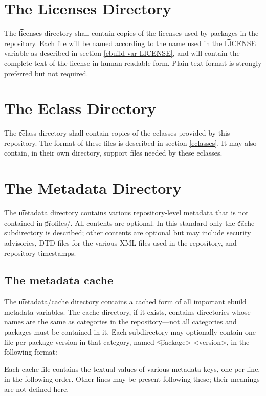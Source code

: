 \section{The Licenses Directory}
\label{licenses-dir}

The \t{licenses} directory shall contain copies of the licenses used by packages in the
repository. Each file will be named according to the name used in the \t{LICENSE} variable as
described in section \ref{ebuild-var-LICENSE}, and will contain the complete text of the license in
human-readable form. Plain text format is strongly preferred but not required.

\section{The Eclass Directory}
\label{eclass-dir}

The \t{eclass} directory shall contain copies of the eclasses provided by this repository. The
format of these files is described in section \ref{eclasses}. It may also contain, in their own
directory, support files needed by these eclasses.

\section{The Metadata Directory}
\label{metadata-dir}

The \t{metadata} directory contains various repository-level metadata that is not contained in
\t{profiles/}. All contents are optional. In this standard only the \t{cache} subdirectory is
described; other contents are optional but may include security advisories, DTD files for the
various XML files used in the repository, and repository timestamps.

\subsection{The metadata cache}

The \t{metadata/cache} directory contains a cached form of all important ebuild metadata variables.
The cache directory, if it exists, contains directories whose names are the same as categories in
the repository---not all categories and packages must be contained in it. Each subdirectory may
optionally contain one file per package version in that category, named \t{<package>-<version>},
in the following format:

Each cache file contains the textual values of various metadata keys, one per line, in the following
order. Other lines may be present following these; their meanings are not defined here.

